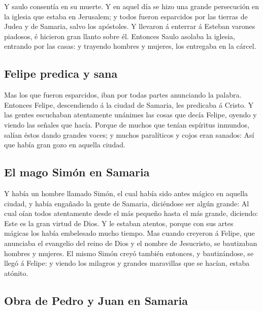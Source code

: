  Y saulo consentía en su muerte. Y en aquel día se hizo una
grande persecución en la iglesia que estaba en Jerusalem; y todos fueron
esparcidos por las tierras de Judea y de Samaria, salvo los apóstoles.
 Y llevaron á enterrar á Esteban varones piadosos, é
hicieron gran llanto sobre él.  Entonces Saulo asolaba la
iglesia, entrando por las casas: y trayendo hombres y mujeres, los
entregaba en la cárcel.

\hypertarget{felipe-predica-y-sana}{%
\subsection{Felipe predica y sana}\label{felipe-predica-y-sana}}

 Mas los que fueron esparcidos, iban por todas partes
anunciando la palabra.  Entonces Felipe, descendiendo á la
ciudad de Samaria, les predicaba á Cristo.  Y las gentes
escuchaban atentamente unánimes las cosas que decía Felipe, oyendo y
viendo las señales que hacía.  Porque de muchos que tenían
espíritus inmundos, salían éstos dando grandes voces; y muchos
paralíticos y cojos eran sanados:  Así que había gran gozo
en aquella ciudad.

\hypertarget{el-mago-simuxf3n-en-samaria}{%
\subsection{El mago Simón en
Samaria}\label{el-mago-simuxf3n-en-samaria}}

 Y había un hombre llamado Simón, el cual había sido antes
mágico en aquella ciudad, y había engañado la gente de Samaria,
diciéndose ser algún grande:  Al cual oían todos
atentamente desde el más pequeño hasta el más grande, diciendo: Este es
la gran virtud de Dios.  Y le estaban atentos, porque con
sus artes mágicas los había embelesado mucho tiempo.  Mas
cuando creyeron á Felipe, que anunciaba el evangelio del reino de Dios y
el nombre de Jesucristo, se bautizaban hombres y mujeres. 
El mismo Simón creyó también entonces, y bautizándose, se llegó á
Felipe: y viendo los milagros y grandes maravillas que se hacían, estaba
atónito.

\hypertarget{obra-de-pedro-y-juan-en-samaria}{%
\subsection{Obra de Pedro y Juan en
Samaria}\label{obra-de-pedro-y-juan-en-samaria}}

